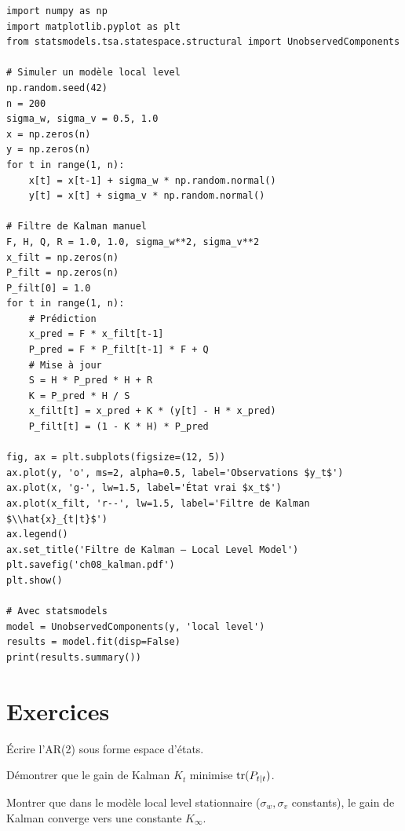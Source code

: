 \begin{codeblock}[title=\textbf{Python}]
\begin{verbatim}
import numpy as np
import matplotlib.pyplot as plt
from statsmodels.tsa.statespace.structural import UnobservedComponents

# Simuler un modèle local level
np.random.seed(42)
n = 200
sigma_w, sigma_v = 0.5, 1.0
x = np.zeros(n)
y = np.zeros(n)
for t in range(1, n):
    x[t] = x[t-1] + sigma_w * np.random.normal()
    y[t] = x[t] + sigma_v * np.random.normal()

# Filtre de Kalman manuel
F, H, Q, R = 1.0, 1.0, sigma_w**2, sigma_v**2
x_filt = np.zeros(n)
P_filt = np.zeros(n)
P_filt[0] = 1.0
for t in range(1, n):
    # Prédiction
    x_pred = F * x_filt[t-1]
    P_pred = F * P_filt[t-1] * F + Q
    # Mise à jour
    S = H * P_pred * H + R
    K = P_pred * H / S
    x_filt[t] = x_pred + K * (y[t] - H * x_pred)
    P_filt[t] = (1 - K * H) * P_pred

fig, ax = plt.subplots(figsize=(12, 5))
ax.plot(y, 'o', ms=2, alpha=0.5, label='Observations $y_t$')
ax.plot(x, 'g-', lw=1.5, label='État vrai $x_t$')
ax.plot(x_filt, 'r--', lw=1.5, label='Filtre de Kalman $\\hat{x}_{t|t}$')
ax.legend()
ax.set_title('Filtre de Kalman — Local Level Model')
plt.savefig('ch08_kalman.pdf')
plt.show()

# Avec statsmodels
model = UnobservedComponents(y, 'local level')
results = model.fit(disp=False)
print(results.summary())
\end{verbatim}
\end{codeblock}

\section{Exercices}

\begin{exercice}[$\star$]
\'Ecrire l'AR(2) sous forme espace d'\'etats.
\end{exercice}

\begin{exercice}[$\star\star$]
D\'emontrer que le gain de Kalman $K_t$ minimise $\operatorname{tr}(P_{t|t})$.
\end{exercice}

\begin{exercice}[$\star\star$]
Montrer que dans le mod\`ele local level stationnaire ($\sigma_w,\sigma_v$ constants), le gain de Kalman converge vers une constante $K_\infty$.
\end{exercice}

